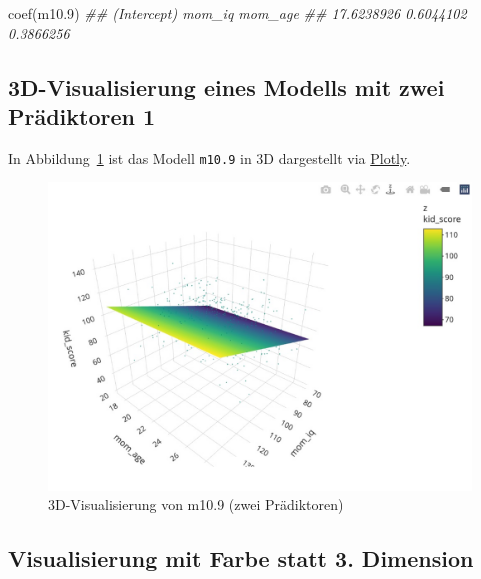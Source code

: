 \documentclass[
  a4paper,
  DIV=11]{scrreprt}
\newenvironment{Shaded}{\begin{snugshade}}{\end{snugshade}}
\newcommand{\DocumentationTok}[1]{\textcolor[rgb]{0.37,0.37,0.37}{\textit{#1}}}
\newcommand{\FloatTok}[1]{\textcolor[rgb]{0.68,0.00,0.00}{#1}}
\newcommand{\FunctionTok}[1]{\textcolor[rgb]{0.28,0.35,0.67}{#1}}
\newcommand{\NormalTok}[1]{\textcolor[rgb]{0.00,0.23,0.31}{#1}}
\theoremstyle{definition}
\theoremstyle{remark}
\begin{document}
\begin{Shaded}
\begin{Highlighting}[]
\FunctionTok{coef}\NormalTok{(m10}\FloatTok{.9}\NormalTok{)}
\DocumentationTok{\#\# (Intercept)      mom\_iq     mom\_age }
\DocumentationTok{\#\#  17.6238926   0.6044102   0.3866256}
\end{Highlighting}
\end{Shaded}

\hypertarget{d-visualisierung-eines-modells-mit-zwei-pruxe4diktoren-1}{%
\subsection{3D-Visualisierung eines Modells mit zwei Prädiktoren
1}\label{d-visualisierung-eines-modells-mit-zwei-pruxe4diktoren-1}}

In Abbildung~\ref{fig-m109-plotly} ist das Modell \texttt{m10.9} in 3D
dargestellt via \href{https://plotly.com/r/}{Plotly}.

\begin{figure}

{\centering \includegraphics[width=1\textwidth,height=\textheight]{./img/m109-plotly.jpg}

}

\caption{\label{fig-m109-plotly}3D-Visualisierung von m10.9 (zwei
Prädiktoren)}

\end{figure}

\hypertarget{visualisierung-mit-farbe-statt-3.-dimension}{%
\subsection{Visualisierung mit Farbe statt 3.
Dimension}\label{visualisierung-mit-farbe-statt-3.-dimension}}
\end{document}
